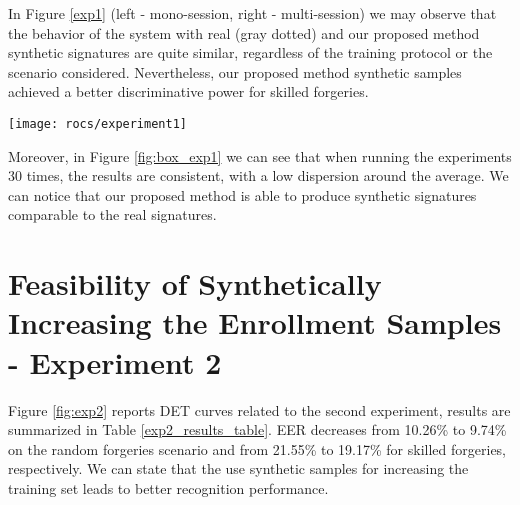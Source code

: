 In Figure \ref{exp1} (left - mono-session, right - multi-session) we
may observe that the behavior of the system with real (gray dotted) and our proposed method synthetic signatures are quite similar, regardless of
the training protocol or the scenario considered. Nevertheless, our proposed method synthetic samples achieved a better discriminative power for skilled forgeries.
\begin{figure*}[!htb]
    \centering
    \texttt{[image: rocs/experiment1]}
    \caption{DET curves for real offline signatures and synthetic signatures (from Diaz \textit{et al.} and our proposed method), for the first experiment (mono-session and multi-session enrollment), for the two scenarios considered (random and skilled impostors)}
    \label{exp1}
\end{figure*}

Moreover, in Figure \ref{fig:box_exp1} we can see that when running the experiments 30 times, the results are consistent, with a low dispersion around the average. We can notice that our proposed method is able to produce synthetic signatures comparable to the real signatures.


\begin{figure*}[!htb]
\centering
\hspace*{0.2in} %
\hspace*{0.3in} %
\hspace*{0.2in} %
\caption{Boxplot comparison for running 30 times the Experiment 1 - mono-session scenario and multi-session. (a) mono-session scenario, random forgeries, (b) mono-session scenario, skilled forgeries, (c) multi-session scenario, random forgeries, (d) multi-session scenario, skilled forgeries. } \label{fig:box_exp1}
\end{figure*}

\section{Feasibility of Synthetically Increasing the Enrollment Samples - Experiment 2}
Figure \ref{fig:exp2} reports DET curves related to the second experiment, results are summarized in Table \ref{exp2_results_table}. EER decreases from 10.26\% to 9.74\% on the random forgeries scenario and from 21.55\% to 19.17\% for skilled forgeries, respectively. We can state that the use synthetic samples for increasing the training set leads to better recognition performance.

